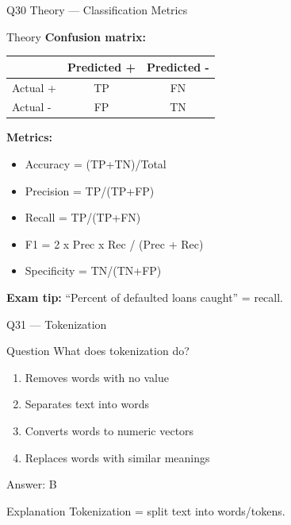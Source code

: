 \documentclass[aspectratio=169,8pt]{beamer}
\begin{document}
	\begin{frame}{Q30 Theory --- Classification Metrics}
		\begin{block}{Theory}
			\textbf{Confusion matrix:}
			\begin{center}
				\small
				\begin{tabular}{@{}lcc@{}}
					\toprule
					& Predicted + & Predicted - \\
					\midrule
					Actual + & TP & FN \\
					Actual - & FP & TN \\
					\bottomrule
				\end{tabular}
			\end{center}
			\textbf{Metrics:}
			\begin{itemize}
				\item Accuracy = (TP+TN)/Total
				\item Precision = TP/(TP+FP)
				\item Recall = TP/(TP+FN)
				\item F1 = 2 x Prec x Rec / (Prec + Rec)
				\item Specificity = TN/(TN+FP)
			\end{itemize}
			\textbf{Exam tip:} ``Percent of defaulted loans caught'' = recall.
		\end{block}
	\end{frame}
	
	\begin{frame}{Q31 --- Tokenization}
		\begin{block}{Question}
			What does tokenization do?
		\end{block}
		\begin{enumerate}[label=\Alph*.]
			\item Removes words with no value
			\item Separates text into words
			\item Converts words to numeric vectors
			\item Replaces words with similar meanings
		\end{enumerate}
		\begin{exampleblock}{Answer: B}
		\end{exampleblock}
		\begin{block}{Explanation}
			Tokenization = split text into words/tokens.
		\end{block}
	\end{frame}
	
\end{document}
